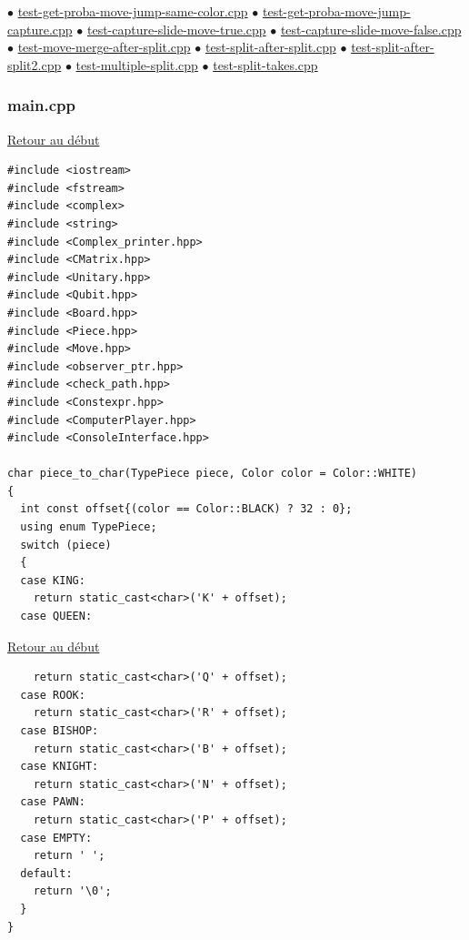 \begin{frame}
$\bullet$ \hyperlink{testgetprobamovejumpsamecolor.cpp}{test-get-proba-move-jump-same-color.cpp}\newline
$\bullet$ \hyperlink{testgetprobamovejumpcapture.cpp}{test-get-proba-move-jump-capture.cpp}\newline
$\bullet$ \hyperlink{testcaptureslidemovetrue.cpp}{test-capture-slide-move-true.cpp}\newline
$\bullet$ \hyperlink{testcaptureslidemovefalse.cpp}{test-capture-slide-move-false.cpp}\newline
$\bullet$ \hyperlink{testmovemergeaftersplit.cpp}{test-move-merge-after-split.cpp}\newline
$\bullet$ \hyperlink{testsplitaftersplit.cpp}{test-split-after-split.cpp}\newline
$\bullet$ \hyperlink{testsplitaftersplit2.cpp}{test-split-after-split2.cpp}\newline
$\bullet$ \hyperlink{testmultiplesplit.cpp}{test-multiple-split.cpp}\newline
$\bullet$ \hyperlink{testsplittakes.cpp}{test-split-takes.cpp}\newline

\end{frame}{\tiny
\begin{frame}[fragile]
\label{main.cpp}
\frametitle{main.cpp}
\hyperlink{conclusion}{Retour au début}\newline
\begin{verbatim}
#include <iostream>
#include <fstream>
#include <complex>
#include <string>
#include <Complex_printer.hpp>
#include <CMatrix.hpp>
#include <Unitary.hpp>
#include <Qubit.hpp>
#include <Board.hpp>
#include <Piece.hpp>
#include <Move.hpp>
#include <observer_ptr.hpp>
#include <check_path.hpp>
#include <Constexpr.hpp>
#include <ComputerPlayer.hpp>
#include <ConsoleInterface.hpp>

char piece_to_char(TypePiece piece, Color color = Color::WHITE)
{
  int const offset{(color == Color::BLACK) ? 32 : 0};
  using enum TypePiece;
  switch (piece)
  {
  case KING:
    return static_cast<char>('K' + offset);
  case QUEEN:
\end{verbatim}
\end{frame}

\begin{frame}[fragile]
\hyperlink{conclusion}{Retour au début}\newline
\begin{verbatim}
    return static_cast<char>('Q' + offset);
  case ROOK:
    return static_cast<char>('R' + offset);
  case BISHOP:
    return static_cast<char>('B' + offset);
  case KNIGHT:
    return static_cast<char>('N' + offset);
  case PAWN:
    return static_cast<char>('P' + offset);
  case EMPTY:
    return ' ';
  default:
    return '\0';
  }
}


\end{verbatim}
\end{frame}}
